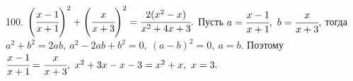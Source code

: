 100. $\left(\cfrac{x-1}{x+1}\right)^2+\left(\cfrac{x}{x+3}\right)^2=\cfrac{2(x^2-x)}{x^2+4x+3}.$ Пусть $a=\cfrac{x-1}{x+1},\ b=\cfrac{x}{x+3},$ тогда $a^2+b^2=2ab,\ a^2-2ab+b^2=0,\ (a-b)^2=0,\ a=b.$ Поэтому $\cfrac{x-1}{x+1}=\cfrac{x}{x+3},\ x^2+3x-x-3=x^2+x,\ x=3.$\\
